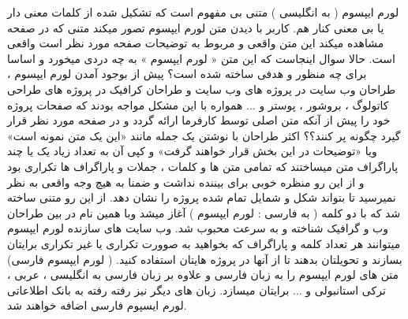لورم ایپسوم ( به انگلیسی  ) متنی بی مفهوم است که تشکیل شده از کلمات معنی دار یا بی معنی کنار هم. کاربر با دیدن متن لورم ایپسوم تصور میکند متنی که در صفحه مشاهده میکند این متن واقعی و مربوط به توضیحات صفحه مورد نظر است واقعی است. حالا سوال اینجاست که این متن « لورم ایپسوم » به چه دردی میخورد و اساسا برای چه منظور و هدفی ساخته شده است؟ پیش از بوجود آمدن لورم ایپسوم ، طراحان وب سایت در پروژه های وب سایت و طراحان کرافیک در پروژه های طراحی کاتولوگ ، بروشور ، پوستر و ... همواره با این مشکل مواجه بودند که صفحات پروژه خود را پیش از آنکه متن اصلی توسط کارفرما ارائه گردد و در صفحه مورد نظر قرار گیرد چگونه پر کنند؟؟ اکثر طراحان با نوشتن یک جمله مانند «این یک متن نمونه است» ویا «توضیحات در این بخش قرار خواهند گرفت» و کپی آن به تعداد زیاد یک یا چند پاراگراف متن میساختند که تمامی متن ها و کلمات ، جملات و پاراگراف ها تکراری بود و از این رو منظره خوبی برای بیننده نداشت و ضمنا به هیچ وجه واقعی به نظر نمیرسید تا بتواند شکل و شمایل تمام شده پروژه را نشان دهد. از این رو متنی ساخته شد که با دو کلمه ( به فارسی : لورم ایپسوم ) آغاز میشد وبا همین نام در بین طراحان وب و گرافیک شناخته و به سرعت محبوب شد. وب سایت های سازنده لورم ایپسوم میتوانند هر تعداد کلمه و پاراگراف که بخواهید به صوورت تکراری یا غیر تکراری برایتان بسازند و تحویلتان بدهند تا از آنها در پروژه هایتان استفاده کنید. ( لورم ایپسوم فارسی) متن های لورم ایپسوم را به زبان فارسی و علاوه بر زبان فارسی به انگلیسی ، عربی ، ترکی استانبولی و ... برایتان میسازد. زبان های دیگر نیز رفته رفته به بانک اطلاعاتی لورم ایسپوم فارسی اضافه خواهند شد.  

